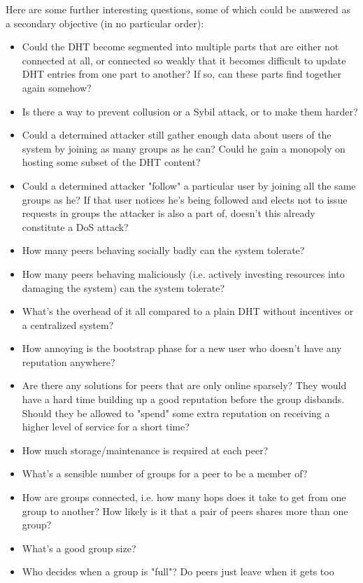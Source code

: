 \documentclass[10pt]{article}
\begin{document}
Here are some further interesting questions, some of which could be answered as
a secondary objective (in no particular order):
\begin{itemize}
\item Could the DHT become segmented into multiple parts that are either not
      connected at all, or connected so weakly that it becomes difficult to
      update DHT entries from one part to another? If so, can these parts find
      together again somehow?
\item Is there a way to prevent collusion or a Sybil attack, or to make them
      harder?
\item Could a determined attacker still gather enough data about users of the
      system by joining as many groups as he can? Could he gain a monopoly on
      hosting some subset of the DHT content?
\item Could a determined attacker "follow" a particular user by joining all the
      same groups as he? If that user notices he's being followed and elects not
      to issue requests in groups the attacker is also a part of, doesn't this
      already constitute a DoS attack?
\item How many peers behaving socially badly can the system tolerate?
\item How many peers behaving maliciously (i.e. actively investing resources
      into damaging the system) can the system tolerate?
\item What's the overhead of it all compared to a plain DHT without incentives
      or a centralized system?
\item How annoying is the bootstrap phase for a new user who doesn't have any
      reputation anywhere?
\item Are there any solutions for peers that are only online sparsely? They
      would have a hard time building up a good reputation before the group
      disbands. Should they be allowed to "spend" some extra reputation on
      receiving a higher level of service for a short time?
\item How much storage/maintenance is required at each peer?
\item What's a sensible number of groups for a peer to be a member of?
\item How are groups connected, i.e. how many hops does it take to get from one
      group to another? How likely is it that a pair of peers shares more than
      one group?
\item What's a good group size?
\item Who decides when a group is "full"? Do peers just leave when it gets too

\end{itemize}
\end{document}
